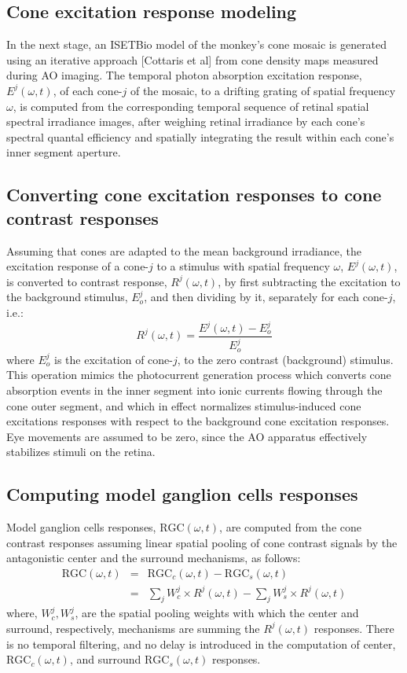 \documentclass[11pt, oneside]{article}   	%
\begin{document}
\subsection{Cone excitation response modeling}
In the next stage, an ISETBio model of the monkey's cone mosaic is generated using an iterative approach [Cottaris et al] from cone density maps measured during AO imaging. The temporal photon absorption excitation response, $E^j(\omega,t)$, of each cone-$j$ of the mosaic, to a drifting grating of spatial frequency $\omega$, is computed from the corresponding temporal sequence of retinal spatial spectral irradiance images, after weighing retinal irradiance by each cone's spectral quantal efficiency and spatially integrating the result within each cone's inner segment aperture. 

\subsection{Converting cone excitation responses to cone contrast responses}
Assuming that cones are adapted to the mean background irradiance, the excitation response of a cone-$j$ to a stimulus with spatial frequency $\omega$, $E^j(\omega,t)$, is converted to contrast response, $R^j(\omega, t)$, by first subtracting the excitation to the background stimulus, $E^j_o$, and then dividing by it, separately for each cone-$j$, i.e.:
\begin{equation}
R^j(\omega, t) = \frac{E^j(\omega,t) - E^j_o}{E^j_o}
\end{equation}
\noindent where
$E^j_o$ is the excitation of cone-$j$, to the zero contrast (background) stimulus. This operation mimics the photocurrent generation process which converts cone absorption events in the inner segment into ionic currents flowing through the cone outer segment, and which in effect normalizes stimulus-induced cone excitations responses with respect to the background cone excitation responses.
Eye movements are assumed to be zero, since the AO apparatus effectively stabilizes stimuli on the retina.


\subsection{Computing model ganglion cells responses}
Model ganglion cells responses, $\mbox{RGC}(\omega,t)$, are computed from the cone contrast responses assuming linear spatial pooling of cone contrast signals by the antagonistic center and the surround mechanisms, as follows:
\begin{eqnarray}
\mbox{RGC}(\omega,t) & = & \mbox{RGC}_c(\omega,t) - \mbox{RGC}_s(\omega,t) \\
& = & \sum_{j} W_{c}^j  \times R^j(\omega, t) -  \sum_{j} W_{s}^j  \times R^j(\omega, t)
\end{eqnarray}
%
\noindent where, $W_{c}^j, W_{s}^j$, are the spatial pooling weights with which the center and surround, respectively, mechanisms are summing the $R^j(\omega, t)$ responses. There is no temporal filtering, and no delay is introduced in the computation of center, $\mbox{RGC}_c(\omega,t)$, and surround $\mbox{RGC}_s(\omega,t)$ responses. 
\end{document}
